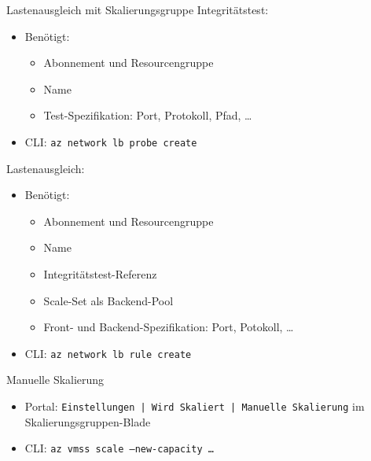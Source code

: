 \begin{flashcard}[Definition]{Lastenausgleich mit Skalierungsgruppe}
    Integritätstest:
    \begin{itemize}
        \item Benötigt:
        \begin{itemize}
            \item Abonnement und Resourcengruppe
            \item Name
            \item Test-Spezifikation: Port, Protokoll, Pfad, \ldots
        \end{itemize}
        \item CLI: \texttt{az network lb probe create}
    \end{itemize}
    Lastenausgleich:
    \begin{itemize}
        \item Benötigt:
        \begin{itemize}
            \item Abonnement und Resourcengruppe
            \item Name
            \item Integritätstest-Referenz
            \item Scale-Set als Backend-Pool
            \item Front- und Backend-Spezifikation: Port, Potokoll, \ldots
        \end{itemize}
        \item CLI: \texttt{az network lb rule create}
    \end{itemize}
\end{flashcard}

\begin{flashcard}[Definition]{Manuelle Skalierung}
    \begin{itemize}
        \item Portal: \texttt{Einstellungen | Wird Skaliert | Manuelle Skalierung} im Skalierungsgruppen-Blade
        \item CLI: \texttt{az vmss scale --new-capacity \ldots}
    \end{itemize}
\end{flashcard}

